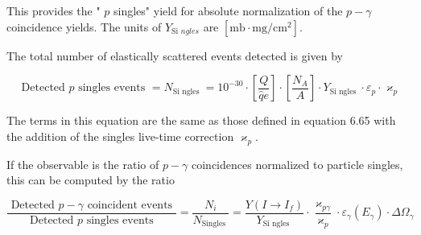 \documentclass[10pt]{article}
\begin{document}
This provides the " $p$ singles" yield for absolute normalization of the $p-\gamma$ coincidence yields. The units of $Y_{\text {Si } n g l e s}$ are $\left[\mathrm{mb} \cdot \mathrm{mg} / \mathrm{cm}^{2}\right]$.

The total number of elastically scattered events detected is given by


\begin{equation*}
\text { Detected } p \text { singles events }=N_{\text {Si ngles }}=10^{-30} \cdot\left[\frac{Q}{\hat{q} e}\right] \cdot\left[\frac{N_{A}}{A}\right] \cdot Y_{\mathrm{Si} \text { ngles }} \cdot \varepsilon_{p} \cdot \varkappa_{p} \tag{6.74}
\end{equation*}


The terms in this equation are the same as those defined in equation 6.65 with the addition of the singles live-time correction $\varkappa_{p}$.

If the observable is the ratio of $p-\gamma$ coincidences normalized to particle singles, this can be computed by the ratio


\begin{equation*}
\frac{\text { Detected } p-\gamma \text { coincident events }}{\text { Detected } p \text { singles events }}=\frac{N_{i}}{N_{\text {Singles }}}=\frac{Y\left(I \rightarrow I_{f}\right)}{Y_{\text {Si ngles }}} \cdot \frac{\varkappa_{p \gamma}}{\varkappa_{p}} \cdot \varepsilon_{\gamma}\left(E_{\gamma}\right) \cdot \Delta \Omega_{\gamma} \tag{6.75}
\end{equation*}
\end{document}
